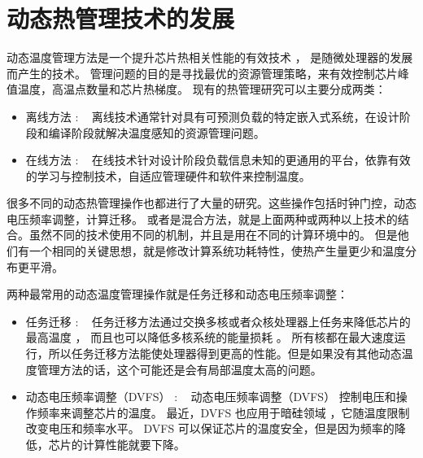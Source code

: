 \section{动态热管理技术的发展}\label{sec:his}

动态温度管理方法是一个提升芯片热相关性能的有效技术 \cite{Donald:ISCA'06}， 是随微处理器的发展而产生的技术。
管理问题的目的是寻找最优的资源管理策略，来有效控制芯片峰值温度，高温点数量和芯片热梯度。
现有的热管理研究可以主要分成两类：
\begin{itemize}
\item 离线方法 : ~ 离线技术通常针对具有可预测负载的特定嵌入式系统，在设计阶段和编译阶段就解决温度感知的资源管理问题。
\item 在线方法 : ~ 在线技术针对设计阶段负载信息未知的更通用的平台，依靠有效的学习与控制技术，自适应管理硬件和软件来控制温度。
\end{itemize}

很多不同的动态热管理操作也都进行了大量的研究。这些操作包括时钟门控，动态电压频率调整，计算迁移。
或者是混合方法，就是上面两种或两种以上技术的结合。虽然不同的技术使用不同的机制，并且是用在不同的计算环境中的。
但是他们有一个相同的关键思想，就是修改计算系统功耗特性，使热产生量更少和温度分布更平滑。

两种最常用的动态温度管理操作就是任务迁移和动态电压频率调整：
\begin{itemize}
\item 任务迁移 :  ~ 任务迁移方法通过交换多核或者众核处理器上任务来降低芯片的最高温度 \cite{Powell:ASPLOS'04,Ge:DAC'10,Chantem:TVLSI'11,Liu:DATE'12,Ayoub:ISLPED'09,Ebi:ICCAD'09} ，
而且也可以降低多核系统的能量损耗 \cite{Cong:ISLPED'12}。
所有核都在最大速度运行，所以任务迁移方法能使处理器得到更高的性能。但是如果没有其他动态温度管理方法的话，这个可能还是会有局部温度太高的问题。
\item 动态电压频率调整（DVFS） :  ~ 动态电压频率调整（DVFS）\cite{Skadron:ISCA'03,Jayaseelan:ICCAD'09,Mutapcic:TCASI'09} 控制电压和操作频率来调整芯片的温度。
 最近，DVFS 也应用于暗硅领域 \cite{Khdr:dac'15,Muthukaruppan:dac'13}，它随温度限制改变电压和频率水平。
 DVFS 可以保证芯片的温度安全，但是因为频率的降低，芯片的计算性能就要下降。
\end{itemize}


 
 

